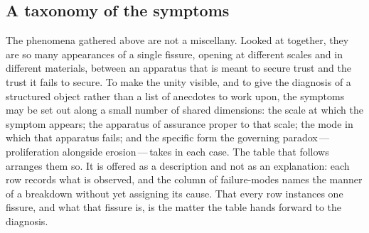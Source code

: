\subsection{A taxonomy of the symptoms}
\label{p13:sub:sympt-taxonomy}

The phenomena gathered above are not a miscellany. Looked at together, they are so many appearances of a single fissure, opening at different scales and in different materials, between an apparatus that is meant to secure trust and the trust it fails to secure. To make the unity visible, and to give the diagnosis of  a structured object rather than a list of anecdotes to work upon, the symptoms may be set out along a small number of shared dimensions: the scale at which the symptom appears; the apparatus of assurance proper to that scale; the mode in which that apparatus fails; and the specific form the governing paradox\,---\,proliferation alongside erosion\,---\,takes in each case. The table that follows arranges them so. It is offered as a description and not as an explanation: each row records what is observed, and the column of failure-modes names the manner of a breakdown without yet assigning its cause. That every row instances one fissure, and what that fissure is, is the matter the table hands forward to the diagnosis.

